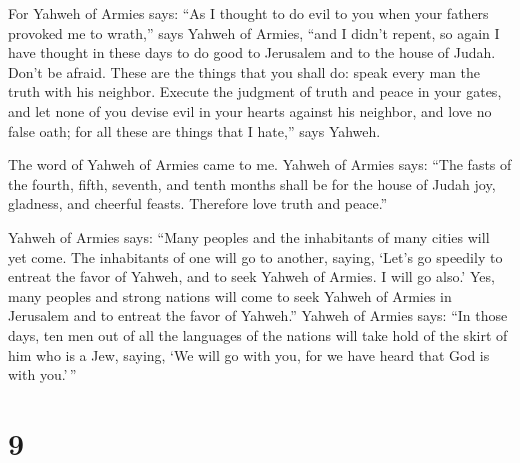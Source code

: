  For Yahweh of Armies says: ``As I thought to do evil to
you when your fathers provoked me to wrath,'' says Yahweh of Armies,
``and I didn't repent,  so again I have thought in these
days to do good to Jerusalem and to the house of Judah. Don't be afraid.
 These are the things that you shall do: speak every man
the truth with his neighbor. Execute the judgment of truth and peace in
your gates,  and let none of you devise evil in your
hearts against his neighbor, and love no false oath; for all these are
things that I hate,'' says Yahweh.

 The word of Yahweh of Armies came to me. 
Yahweh of Armies says: ``The fasts of the fourth, fifth, seventh, and
tenth months shall be for the house of Judah joy, gladness, and cheerful
feasts. Therefore love truth and peace.''

 Yahweh of Armies says: ``Many peoples and the
inhabitants of many cities will yet come.  The
inhabitants of one will go to another, saying, `Let's go speedily to
entreat the favor of Yahweh, and to seek Yahweh of Armies. I will go
also.'  Yes, many peoples and strong nations will come to
seek Yahweh of Armies in Jerusalem and to entreat the favor of Yahweh.''
 Yahweh of Armies says: ``In those days, ten men out of
all the languages of the nations will take hold of the skirt of him who
is a Jew, saying, `We will go with you, for we have heard that God is
with you.'\,''

\hypertarget{section-8}{%
\section{9}\label{section-8}}

